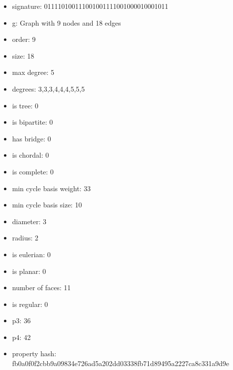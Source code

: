 \newpage
\begin{figure}
\end{figure}
\begin{itemize}
\item signature: 011110100111001001111001000010001011
\item g: Graph with 9 nodes and 18 edges
\item order: 9
\item size: 18
\item max degree: 5
\item degrees: 3,3,3,4,4,4,5,5,5
\item is tree: 0
\item is bipartite: 0
\item has bridge: 0
\item is chordal: 0
\item is complete: 0
\item min cycle basis weight: 33
\item min cycle basis size: 10
\item diameter: 3
\item radius: 2
\item is eulerian: 0
\item is planar: 0
\item number of faces: 11
\item is regular: 0
\item p3: 36
\item p4: 42
\item property hash: fb0a0f0f2cbb9a09834e726ad5a202dd03338fb71d89495a2227ca8c331a9d9e
\end{itemize}
